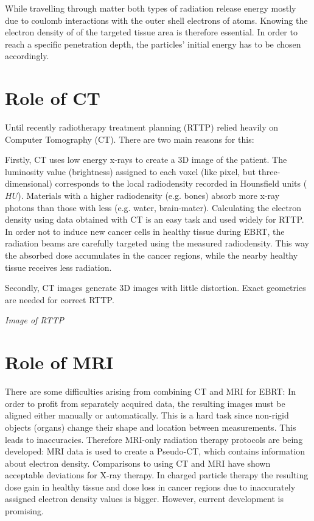 While travelling through matter both types of radiation release energy mostly due to coulomb interactions with the outer shell electrons of atoms.
Knowing the electron density of of the targeted tissue area is therefore essential. In order to reach a specific penetration depth, the particles' initial energy has to be chosen accordingly.

\section{Role of CT}

Until recently radiotherapy treatment planning (RTTP) relied heavily on Computer Tomography (CT). There are two main reasons for this:

Firstly, CT uses low energy x-rays to create a 3D image of the patient. The luminosity value (brightness) assigned to each voxel (like pixel, but three-dimensional) corresponds to
the local radiodensity recorded in Hounsfield units ($HU$). Materials with a higher radiodensity (e.g. bones) absorb more x-ray photons than those with less (e.g. water, brain-mater).
Calculating the electron density using data obtained with CT is an easy task and used widely for RTTP. \cite{Constantinou2012, Schneider1996}
In order not to induce new cancer cells in healthy tissue during EBRT, the radiation beams are carefully targeted using the measured radiodensity. 
This way the absorbed dose accumulates in the cancer regions, while the nearby healthy tissue receives less radiation.

Secondly, CT images generate 3D images with little distortion. Exact geometries are needed for correct RTTP. %

\vspace{4cm}
\textit{Image of RTTP}
\vspace{2cm}

\section{Role of MRI}
There are some difficulties arising from combining CT and MRI for EBRT:
In order to profit from separately acquired data, the resulting images must be aligned either manually or automatically. This is a hard task since non-rigid objects (organs) change their shape and location between measurements. This leads to inaccuracies.
Therefore MRI-only radiation therapy protocols are being developed:
MRI data is used to create a Pseudo-CT, which contains information about electron density. Comparisons to using CT and MRI have shown acceptable deviations for X-ray therapy.
In charged particle therapy the resulting dose gain in healthy tissue and dose loss in cancer regions due to inaccurately assigned electron density values is bigger.
However, current development is promising. \cite{Rank2013, Stanescu2006, Nyholm2015, Greer2015, Chen2004}


